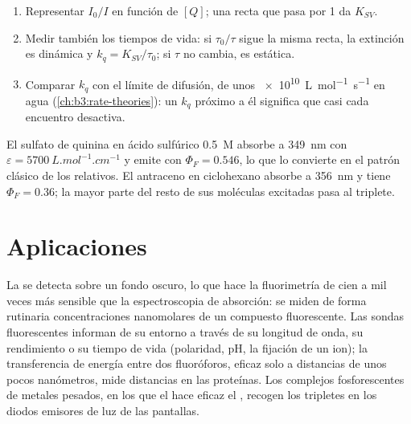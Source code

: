 \begin{method}\label{met:b3:electronic-spectroscopy:stern-volmer}
\begin{enumerate}
  \item Representar $I_0/I$ en función de $[Q]$; una recta que pasa por 1 da $K_{SV}$.
  \item Medir también los tiempos de vida: si $\tau_0/\tau$ sigue la misma recta, la extinción
        es dinámica y $k_q = K_{SV}/\tau_0$; si $\tau$ no cambia, es estática.
  \item Comparar $k_q$ con el límite de difusión, de unos \qty{e10}{L.mol^{-1}.s^{-1}} en
        agua (\cref{ch:b3:rate-theories}): un $k_q$ próximo a él significa que casi cada
        encuentro desactiva.
\end{enumerate}
\end{method}

\begin{example}\label{ex:b3:electronic-spectroscopy:quinine}
El sulfato de quinina en ácido sulfúrico \qty{0.5}{M} absorbe a \qty{349}{nm} con $\varepsilon =
\qty{5700}{L.mol^{-1}.cm^{-1}}$ y emite  con $\Phi_F = 0.546$, lo que lo convierte en el
patrón clásico de los  relativos. El antraceno en ciclohexano
absorbe a \qty{356}{nm} y tiene $\Phi_F = 0.36$; la mayor parte del resto de sus moléculas
excitadas pasa al triplete.
\end{example}

\section{Aplicaciones}

La  se detecta sobre un fondo oscuro, lo que hace la fluorimetría
de cien a mil veces más sensible que la espectroscopia de absorción:
se miden de forma rutinaria concentraciones nanomolares de un compuesto fluorescente.
Las sondas fluorescentes informan de su entorno a través de su longitud de onda,
su rendimiento o su tiempo de vida (polaridad, pH, la fijación de un ion); la transferencia de energía
entre dos fluoróforos, eficaz solo a distancias de unos pocos nanómetros, mide
distancias en las proteínas. Los complejos fosforescentes de metales pesados, en los que el
 hace eficaz el , recogen los tripletes
en los diodos emisores de luz de las pantallas.

